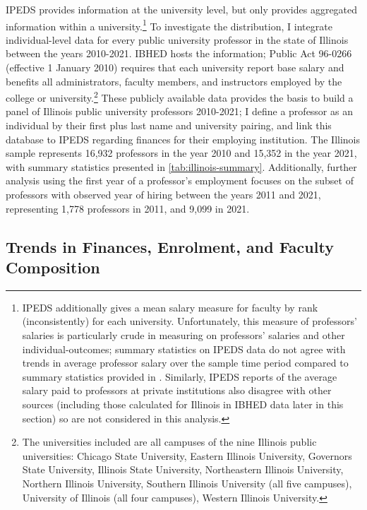 IPEDS provides information at the university level, but only provides aggregated information within a university.\footnote{
    IPEDS additionally gives a mean salary measure for faculty by rank (inconsistently) for each university.
    Unfortunately, this measure of professors' salaries is particularly crude in measuring on professors' salaries and other individual-outcomes; summary statistics on IPEDS data do not agree with trends in average professor salary over the sample time period compared to summary statistics provided in \citealt{aau2021survey}.
    Similarly, IPEDS reports of the average salary paid to professors at private institutions also disagree with other sources (including those calculated for Illinois in IBHED data later in this section) so are not considered in this analysis.
}
To investigate the distribution, I integrate individual-level data for every public university professor in the state of Illinois between the years 2010-2021.
IBHED hosts the information;
Public Act 96-0266 (effective 1 January 2010) requires that each university report base salary and benefits all administrators, faculty members, and instructors employed by the college or university.\footnote{
    The universities included are all campuses of the nine Illinois public universities: Chicago State University, Eastern Illinois University, Governors State University, Illinois State University, Northeastern Illinois University, Northern Illinois University, Southern Illinois University  (all five campuses), University of Illinois (all four campuses), Western Illinois University.
}
These publicly available data provides the basis to build a panel of Illinois public university professors 2010-2021; I define a professor as an individual by their first plus last name and university pairing, and link this database to IPEDS regarding finances for their employing institution.
The Illinois sample represents 16,932 professors in the year 2010 and 15,352 in the year 2021, with summary statistics presented in \autoref{tab:illinois-summary}.
Additionally, further analysis using the first year of a professor's employment focuses on the subset of professors with observed year of hiring between the years 2011 and 2021, representing 1,778 professors in 2011, and 9,099 in 2021.

\subsection{Trends in Finances, Enrolment, and Faculty Composition}
\label{sec:trends}

